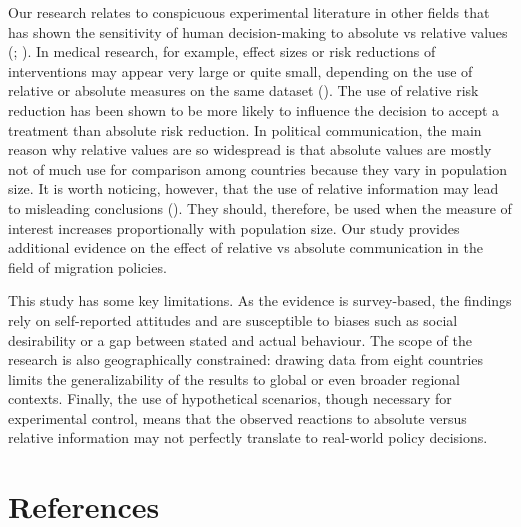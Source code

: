 \documentclass[
  12pt,
  a4paper,
]{article}
\begin{document}
Our research relates to conspicuous experimental literature in other fields that has shown the sensitivity of human decision-making to absolute vs relative values (; ). In medical research, for example, effect sizes or risk reductions of interventions may appear very large or quite small, depending on the use of relative or absolute measures on the same dataset (). The use of relative risk reduction has been shown to be more likely to influence the decision to accept a treatment than absolute risk reduction. In political communication, the main reason why relative values are so widespread is that absolute values are mostly not of much use for comparison among countries because they vary in population size. It is worth noticing, however, that the use of relative information may lead to misleading conclusions (). They should, therefore, be used when the measure of interest increases proportionally with population size. Our study provides additional evidence on the effect of relative vs absolute communication in the field of migration policies.

This study has some key limitations. As the evidence is survey-based, the findings rely on self-reported attitudes and are susceptible to biases such as social desirability or a gap between stated and actual behaviour. The scope of the research is also geographically constrained: drawing data from eight countries limits the generalizability of the results to global or even broader regional contexts. Finally, the use of hypothetical scenarios, though necessary for experimental control, means that the observed reactions to absolute versus relative information may not perfectly translate to real-world policy decisions.

\section*{References}\label{references}
\end{document}
